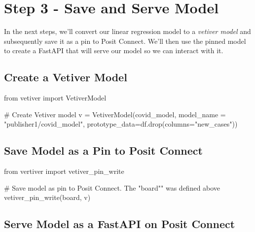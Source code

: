 \documentclass[
  letterpaper,
  DIV=11,
  numbers=noendperiod]{scrreprt}
\newenvironment{Shaded}{\begin{snugshade}}{\end{snugshade}}
\newcommand{\CommentTok}[1]{\textcolor[rgb]{0.37,0.37,0.37}{#1}}
\newcommand{\ImportTok}[1]{\textcolor[rgb]{0.00,0.46,0.62}{#1}}
\newcommand{\NormalTok}[1]{\textcolor[rgb]{0.00,0.23,0.31}{#1}}
\newcommand{\OperatorTok}[1]{\textcolor[rgb]{0.37,0.37,0.37}{#1}}
\newcommand{\StringTok}[1]{\textcolor[rgb]{0.13,0.47,0.30}{#1}}
\begin{document}
\section{Step 3 - Save and Serve
Model}\label{step-3---save-and-serve-model}

In the next steps, we'll convert our linear regression model to a
\emph{vetiver model} and subsequently save it as a pin to Posit Connect.
We'll then use the pinned model to create a FastAPI that will serve our
model so we can interact with it.

\subsection{Create a Vetiver Model}\label{create-a-vetiver-model}

\begin{Shaded}
\begin{Highlighting}[]
\ImportTok{from}\NormalTok{ vetiver }\ImportTok{import}\NormalTok{ VetiverModel}

\CommentTok{\# Create Vetiver model}
\NormalTok{v }\OperatorTok{=}\NormalTok{ VetiverModel(covid\_model, model\_name }\OperatorTok{=} \StringTok{"publisher1/covid\_model"}\NormalTok{, prototype\_data}\OperatorTok{=}\NormalTok{df.drop(columns}\OperatorTok{=}\StringTok{"new\_cases"}\NormalTok{))}
\end{Highlighting}
\end{Shaded}

\subsection{Save Model as a Pin to Posit
Connect}\label{save-model-as-a-pin-to-posit-connect}

\begin{Shaded}
\begin{Highlighting}[]
\ImportTok{from}\NormalTok{ vertiver }\ImportTok{import}\NormalTok{ vetiver\_pin\_write}

\CommentTok{\# Save model as pin to Posit Connect. The "board"" was defined above}
\NormalTok{vetiver\_pin\_write(board, v)}
\end{Highlighting}
\end{Shaded}

\subsection{Serve Model as a FastAPI on Posit
Connect}\label{serve-model-as-a-fastapi-on-posit-connect}
\end{document}
